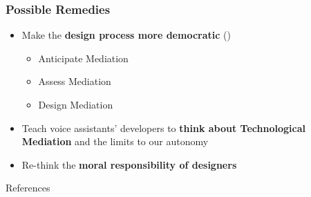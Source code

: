 \documentclass{beamer}
\begin{document}
\begin{frame}
\frametitle{Possible Remedies}
\begin{itemize}
	\item Make the \textbf{design process more democratic} (\cite{verbeek2011moralizing})
	\smallskip
	\begin{itemize}
		\item Anticipate Mediation
		\item Assess Mediation
		\item Design Mediation
		
	\end{itemize}
	\medskip
	\item Teach voice assistants' developers to \textbf{think about Technological Mediation} and the limits to our autonomy
	\medskip
	\item Re-think the \textbf{moral responsibility of designers}
\end{itemize}
\end{frame}

\nocite{*}
\begin{frame}{References}
\renewcommand*{\bibfont}{\small}
\printbibliography
\end{frame}
\end{document}

